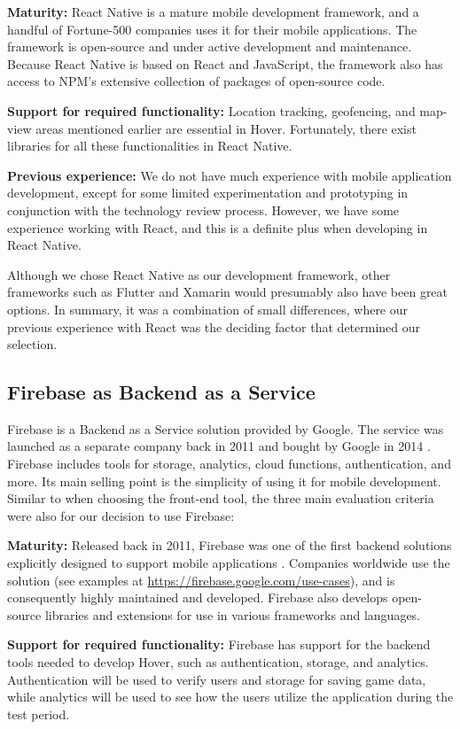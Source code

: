 \documentclass[../Main.tex]{subfiles}
\begin{document}
\textbf{Maturity:} 
React Native is a mature mobile development framework, and a handful of Fortune-500 companies uses it for their mobile applications. The framework is open-source and under active development and maintenance. Because React Native is based on React and JavaScript, the framework also has access to NPM’s extensive collection of packages of open-source code.

\textbf{Support for required functionality:} 
Location tracking, geofencing, and map-view areas mentioned earlier are essential in Hover. Fortunately, there exist libraries for all these functionalities in React Native.

\textbf{Previous experience:}
We do not have much experience with mobile application development, except for some limited experimentation and prototyping in conjunction with the technology review process. However, we have some experience working with React, and this is a definite plus when developing in React Native.

Although we chose React Native as our development framework, other frameworks such as Flutter and Xamarin would presumably also have been great options. In summary, it was a combination of small differences, where our previous experience with React was the deciding factor that determined our selection.

\subsection{Firebase as Backend as a Service}
Firebase is a Backend as a Service solution provided by Google. The service was launched as a separate company back in 2011 and bought by Google in 2014 \citep{tamplin_firebase_2014}. Firebase includes tools for storage, analytics, cloud functions, authentication, and more. Its main selling point is the simplicity of using it for mobile development. Similar to when choosing the front-end tool, the three main evaluation criteria were also for our decision to use Firebase:

\textbf{Maturity:} 
Released back in 2011, Firebase was one of the first backend solutions explicitly designed to support mobile applications \citep{metz_firebase_2012}. Companies worldwide use the solution (see examples at \url{https://firebase.google.com/use-cases}), and is consequently highly maintained and developed. Firebase also develops open-source libraries and extensions for use in various frameworks and languages. 

\textbf{Support for required functionality:}
Firebase has support for the backend tools needed to develop Hover, such as authentication, storage, and analytics. Authentication will be used to verify users and storage for saving game data, while analytics will be used to see how the users utilize the application during the test period.
\end{document}
